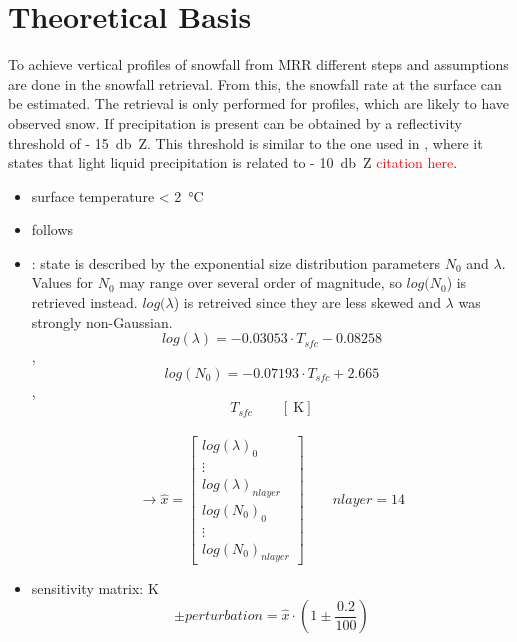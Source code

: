 \section{Theoretical Basis}\label{sec:ret_th}
To achieve vertical profiles of snowfall from MRR different steps and assumptions are done in the snowfall retrieval. From this, the snowfall rate at the surface can be estimated. The retrieval is only performed for profiles, which are likely to have observed snow. If precipitation is present can be obtained by a reflectivity threshold of \SI{- 15}{\decibel Z}. This threshold is similar to the one used in \cite{wood_level_2013}, where it states that light liquid precipitation is related to \SI{- 10}{\decibel Z} \textcolor{red}{citation here}.
\begin{itemize}
	\item surface temperature \SI{< 2}{\celsius}
	\item follows 
	\item \citep{wood_level_2013}: state is described by the exponential size distribution parameters $N_0$ and $\lambda$. Values for $N_0$ may range over several order of magnitude, so $log(N_0$) is retrieved instead. $log(\lambda$) is retreived since they are less skewed and $\lambda$ was strongly non-Gaussian. \\
	$$log(\lambda) = -0.03053 \cdot T_{sfc} - 0.08258$$, \\ 
	$$log(N_0) = -0.07193 \cdot T_{sfc} +2.665$$, \\
	$$T_{sfc} \qquad [\SI{}{\kelvin}] $$\\
	$$\rightarrow \hat{x} = \begin{bmatrix}
	log(\lambda)_0 	\\
	\vdots 			\\
	log(\lambda)_{nlayer} 	\\
	log(N_0)_0		\\
	\vdots			\\
	log(N_0)_{nlayer}		
	\end{bmatrix} \qquad nlayer = 14$$
	\item sensitivity matrix: K \\
	$$\pm perturbation = \hat{x} \cdot \left(1 \pm \frac{0.2}{100}\right)$$ \\
	

\end{itemize}
